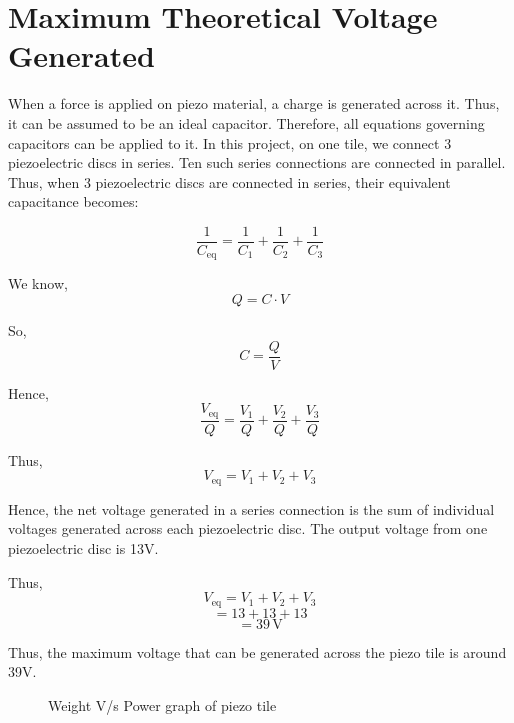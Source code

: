 \documentclass[12pt]{article}
\begin{document}
\newpage

\section*{Maximum Theoretical Voltage Generated}

When a force is applied on piezo material, a charge is generated across it. Thus, it can be assumed to be an ideal capacitor. Therefore, all equations governing capacitors can be applied to it. In this project, on one tile, we connect 3 piezoelectric discs in series. Ten such series connections are connected in parallel. Thus, when 3 piezoelectric discs are connected in series, their equivalent capacitance becomes:

$$ \frac{1}{C_{\text{eq}}} = \frac{1}{C_1} + \frac{1}{C_2} + \frac{1}{C_3} $$

We know,
$$ Q = C \cdot V $$

So,
$$ C = \frac{Q}{V} $$

Hence,
$$ \frac{V_{\text{eq}}}{Q} = \frac{V_1}{Q} + \frac{V_2}{Q} + \frac{V_3}{Q} $$

Thus,
$$ V_{\text{eq}} = V_1 + V_2 + V_3 $$

Hence, the net voltage generated in a series connection is the sum of individual voltages generated across each piezoelectric disc. The output voltage from one piezoelectric disc is 13V.

Thus,
$$ V_{\text{eq}} = V_1 + V_2 + V_3 $$
$$ = 13 + 13 + 13 $$
$$ = 39 \, \text{V} $$

Thus, the maximum voltage that can be generated across the piezo tile is around 39V.

 \newpage 


\begin{figure}[h!]
\centering
{}
\caption{Weight V/s Power graph of piezo tile}
\label{fig:piezo_tile_graph}
\end{figure}
\end{document}
